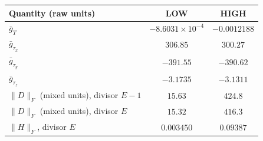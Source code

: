 \begin{tabular}{@{}lcc@{}}
\toprule
Quantity (raw units) & LOW & HIGH\\
\midrule
$\bar g_{T}$ & $-8.6031\times10^{-4}$ & $-0.0012188$\\
$\bar g_{\tau_x}$ & $306.85$ & $300.27$\\
$\bar g_{\tau_y}$ & $-391.55$ & $-390.62$\\
$\bar g_{\tau_z}$ & $-3.1735$ & $-3.1311$\\
$\|D\|_F$ (mixed units), divisor $E-1$ & $15.63$ & $424.8$\\
$\|D\|_F$ (mixed units), divisor $E$ & $15.32$ & $416.3$\\
$\|H\|_F$, divisor $E$ & $0.003450$ & $0.09387$\\
\bottomrule
\end{tabular}
